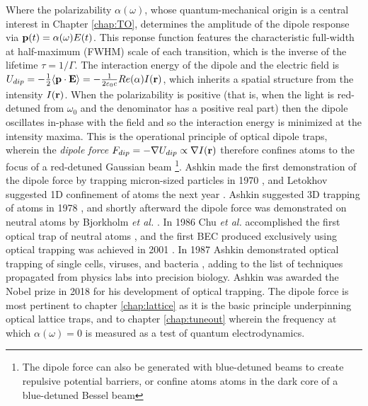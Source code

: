 	Where the polarizability $\alpha(\omega)$, whose quantum-mechanical origin is a central interest in Chapter \ref{chap:TO}, determines the amplitude of the dipole response via $\textbf{p}(t) = \alpha(\omega)E(t)$.
	This reponse function features the characteristic full-width at half-maximum (FWHM) scale of each transition, which is the inverse of the lifetime $\tau=1/\Gamma$.
	The interaction energy of the dipole and the electric field is $U_{dip} = -\frac{1}{2}\langle\textbf{p}\cdot\textbf{E}\rangle = -\frac{1}{2\varepsilon_0 c}Re(\alpha)I(\textbf{r})$, which inherits a spatial structure from the intensity $I(\textbf{r})$.
	When the polarizability is positive (that is, when the light is red-detuned from $\omega_0$ and the denominator has a positive real part) then the dipole oscillates in-phase with the field and so the interaction energy is minimized at the intensity maxima.
	This is the operational principle of optical dipole traps, wherein the \emph{dipole force} $F_{dip} = -\nabla U_{dip} \propto \nabla I(\textbf{r})$ therefore confines atoms to the focus of a red-detuned Gaussian beam \footnote{The dipole force can also be generated with blue-detuned beams to create repulsive potential barriers, or confine atoms atoms in the dark core of a blue-detuned Bessel beam}.
	Ashkin made the first demonstration of the dipole force by trapping micron-sized particles in 1970 \cite{ashkin70}, and Letokhov suggested 1D confinement of atoms the next year \cite{}.
	Ashkin suggested 3D trapping of atoms in 1978 \cite{ashkin78}, and shortly afterward the dipole force was demonstrated on neutral atoms by Bjorkholm \emph{et al.} \cite{}.
	In 1986 Chu \emph{et al.} accomplished the first optical trap of neutral atoms \cite{chu86}, and the first BEC produced exclusively using optical trapping was achieved in 2001 \cite{barrett01}.
	In 1987 Ashkin demonstrated optical trapping of single cells, viruses, and bacteria \cite{ashkin87cell, ashkin87virus}, adding to the list of techniques propagated from physics labs into precision biology.
	Ashkin was awarded the Nobel prize in 2018 for his development of optical trapping.
	The dipole force is most pertinent to chapter \ref{chap:lattice} as it is the basic principle underpinning optical lattice traps, and to chapter \ref{chap:tuneout} wherein the frequency at which $\alpha(\omega)=0$ is measured as a test of quantum electrodynamics.
	


